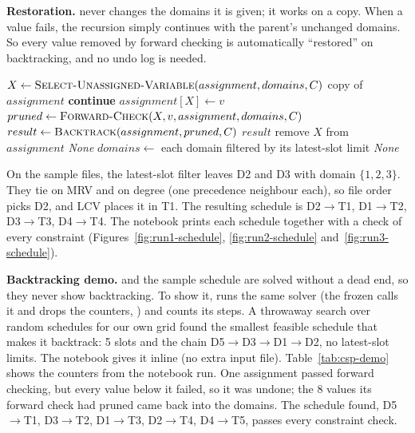 \textbf{Restoration.}  never changes the domains it is given; it works on a
copy. When a value fails, the recursion simply continues with the parent's unchanged domains. So
every value removed by forward checking is automatically ``restored'' on backtracking, and no undo
log is needed.

\begin{algorithm}[H]
\caption{Backtracking search with MRV, degree, LCV and forward checking}
\begin{algorithmic}[1]
  \State $X \gets \Call{Select-Unassigned-Variable}{assignment, domains, C}$ 
   \Return copy of $assignment$ 
  \EndIf
   
     \textbf{continue}
    \EndIf
    \State $assignment[X] \gets v$
    \State $pruned \gets \Call{Forward-Check}{X, v, assignment, domains, C}$ 
      \State $result \gets \Call{Backtrack}{assignment, pruned, C}$
       \Return $result$
      \EndIf
    \EndIf
    \State remove $X$ from $assignment$ 
  \EndFor
  \State \Return \textit{None}
\EndFunction
\Statex
{}
  \State $domains \gets$ each domain filtered by its latest-slot limit
   \Return \textit{None}
  \EndIf
  \State \Return {}
\EndFunction
\end{algorithmic}
\end{algorithm}

On the sample files, the latest-slot filter leaves D2 and D3 with domain $\{1,2,3\}$. They tie on
MRV and on degree (one precedence neighbour each), so file order picks D2, and LCV places it in T1.
The resulting schedule is D2$\to$T1, D1$\to$T2, D3$\to$T3, D4$\to$T4. The notebook prints each
schedule together with a check of every constraint (Figures~\ref{fig:run1-schedule}, \ref{fig:run2-schedule} and~\ref{fig:run3-schedule}).

\textbf{Backtracking demo.}  and the sample schedule are solved without a dead
end, so they never show backtracking. To show it,  runs the
same solver (the frozen  calls it and drops the counters, ) and
counts its steps. A throwaway search over random schedules for our own grid found the smallest
feasible schedule that makes it backtrack: 5 slots and the chain D5$\to$D3$\to$D1$\to$D2, no
latest-slot limits. The notebook gives it inline (no extra input file). Table~\ref{tab:csp-demo}
shows the counters from the notebook run. One assignment passed forward checking, but every value
below it failed, so it was undone; the 8 values its forward check had pruned came back into the
domains. The schedule found, D5$\to$T1, D3$\to$T2, D1$\to$T3, D2$\to$T4, D4$\to$T5, passes every
constraint check.

